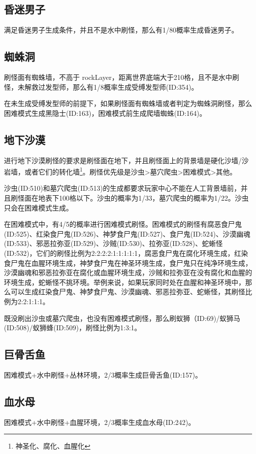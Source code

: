 \subsection{昏迷男子}
满足昏迷男子生成条件，并且不是水中刷怪，那么有1/80概率生成昏迷男子。

\subsection{蜘蛛洞}
刷怪面有蜘蛛墙，不高于 rockLayer，距离世界底端大于210格，且不是水中刷怪，未解救过发型师，那么有1/8概率生成受缚发型师(ID:354)。

在未生成受缚发型师的前提下，如果刷怪面有蜘蛛墙或者判定为蜘蛛洞刷怪，那么困难模式生成黑隐士(ID:163)，困难模式前生成爬墙蜘蛛(ID:164)。

\subsection{地下沙漠}
进行地下沙漠刷怪的要求是刷怪面在地下，并且刷怪面上的背景墙是硬化沙墙/沙岩墙，或者它们的转化墙\footnote{神圣化、腐化、血腥化}。刷怪优先级是沙虫>墓穴爬虫>困难模式>其他。

沙虫(ID:510)和墓穴爬虫(ID:513)的生成都要求玩家中心不能在人工背景墙前，并且刷怪面在地表下100格以下。沙虫的概率为1/33，墓穴爬虫的概率为1/22。沙虫只会在困难模式生成。

在困难模式中，有4/5的概率进行困难模式刷怪。困难模式的刷怪有腐恶食尸鬼(ID:525)、红染食尸鬼(ID:526)、神梦食尸鬼(ID:527)、食尸鬼(ID:524)、沙漠幽魂(ID:533)、邪恶拉弥亚(ID:529)、沙贼(ID:530)、拉弥亚(ID:528)、蛇蜥怪(ID:532)，它们的刷怪比例为2:2:2:2:1:1:1:1:1，腐恶食尸鬼在腐化环境生成，红染食尸鬼在血腥环境生成，神梦食尸鬼在神圣环境生成，食尸鬼只在纯净环境生成，沙漠幽魂和邪恶拉弥亚在腐化或血腥环境生成，沙贼和拉弥亚在没有腐化和血腥的环境生成，蛇蜥怪不挑环境。举例来说，如果玩家同时处在血腥和神圣环境中，那么可以生成红染食尸鬼、神梦食尸鬼、沙漠幽魂、邪恶拉弥亚、蛇蜥怪，其刷怪比例为2:2:1:1:1。

既没刷出沙虫或墓穴爬虫，也没有困难模式刷怪，那么刷蚁狮（ID:69)/蚁狮马(ID:508)/蚁狮蜂(ID:509)，刷怪比例为1:3:1。

\subsection{巨骨舌鱼}
困难模式+水中刷怪+丛林环境，2/3概率生成巨骨舌鱼(ID:157)。

\subsection{血水母}
困难模式+水中刷怪+血腥环境，2/3概率生成血水母(ID:242)。

